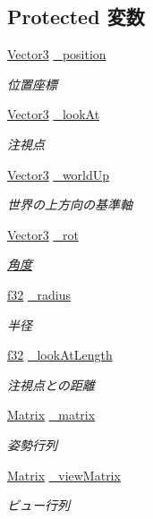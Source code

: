 \subsection*{Protected 変数}
\begin{DoxyCompactItemize}
\item 
\hyperlink{struct_vector3}{Vector3} \hyperlink{class_camera_base_a3452d98af9a9d4323d8a2d3e6dc966e5}{\-\_\-position}
\begin{DoxyCompactList}\small\item\em 位置座標 \end{DoxyCompactList}\item 
\hyperlink{struct_vector3}{Vector3} \hyperlink{class_camera_base_aa89610f1021ae21eebcbe9e17c557ad1}{\-\_\-look\-At}
\begin{DoxyCompactList}\small\item\em 注視点 \end{DoxyCompactList}\item 
\hyperlink{struct_vector3}{Vector3} \hyperlink{class_camera_base_ad65432efc07bb5d95268166cb432e0b2}{\-\_\-world\-Up}
\begin{DoxyCompactList}\small\item\em 世界の上方向の基準軸 \end{DoxyCompactList}\item 
\hyperlink{struct_vector3}{Vector3} \hyperlink{class_camera_base_a26a9abf2c69bd35302dfd5546facaa59}{\-\_\-rot}
\begin{DoxyCompactList}\small\item\em \hyperlink{class_xE8_xA7_x92_xE5_xBA_xA6}{角度} \end{DoxyCompactList}\item 
\hyperlink{_main_8h_a5f6906312a689f27d70e9d086649d3fd}{f32} \hyperlink{class_camera_base_a601245a0b3275adcd1f64b518b17a218}{\-\_\-radius}
\begin{DoxyCompactList}\small\item\em 半径 \end{DoxyCompactList}\item 
\hyperlink{_main_8h_a5f6906312a689f27d70e9d086649d3fd}{f32} \hyperlink{class_camera_base_a49508fac0dc3362b7e60f614e3f9c669}{\-\_\-look\-At\-Length}
\begin{DoxyCompactList}\small\item\em 注視点との距離 \end{DoxyCompactList}\item 
\hyperlink{struct_matrix}{Matrix} \hyperlink{class_camera_base_ad57a54d46b6005687ee5dfa6a99e2807}{\-\_\-matrix}
\begin{DoxyCompactList}\small\item\em 姿勢行列 \end{DoxyCompactList}\item 
\hyperlink{struct_matrix}{Matrix} \hyperlink{class_camera_base_ac982bf8a4c710d101c988618346d144d}{\-\_\-view\-Matrix}
\begin{DoxyCompactList}\small\item\em ビュー行列 \end{DoxyCompactList}\end{DoxyCompactItemize}



